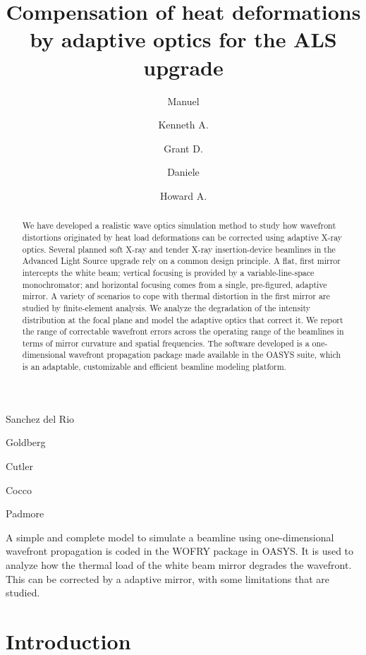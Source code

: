 \documentclass[preprint]{iucr}
\begin{document}

\title{Compensation of heat deformations by adaptive optics for the ALS upgrade}

\author[a]{Manuel}{Sanchez del Rio}
\author[a]{Kenneth A.}{Goldberg}
\author[a]{Grant D.}{Cutler}
\author[a]{Daniele}{Cocco}
\author[a]{Howard A.}{Padmore}

 
\maketitle

\begin{synopsis}
A simple and complete model to simulate a beamline using one-dimensional wavefront propagation is coded in the WOFRY package in OASYS. It is used to analyze how the thermal load of the white beam mirror degrades the wavefront. This can be corrected by a adaptive mirror, with some limitations that are studied.
\end{synopsis}

\begin{abstract}
We have developed a realistic wave optics simulation method to study how wavefront distortions originated by heat load deformations can be corrected using adaptive X-ray optics. Several planned soft X-ray and tender X-ray insertion-device beamlines in the Advanced Light Source upgrade rely on a common design principle. A flat, first mirror intercepts the white beam; vertical focusing is provided by a variable-line-space monochromator; and horizontal focusing comes from a single, pre-figured, adaptive mirror. 
A variety of scenarios to cope with thermal distortion in the first mirror are studied by finite-element analysis. We analyze the degradation of the intensity distribution at the focal plane and model the adaptive optics that correct it. We report the range of correctable wavefront errors across the operating range of the beamlines in terms of mirror curvature and spatial frequencies. The software developed is a one-dimensional wavefront propagation package made available in the OASYS suite, which is an adaptable, customizable and efficient beamline modeling platform.
\end{abstract}

%
%
%
\section{Introduction}
\label{sec:intro}  
\end{document}
